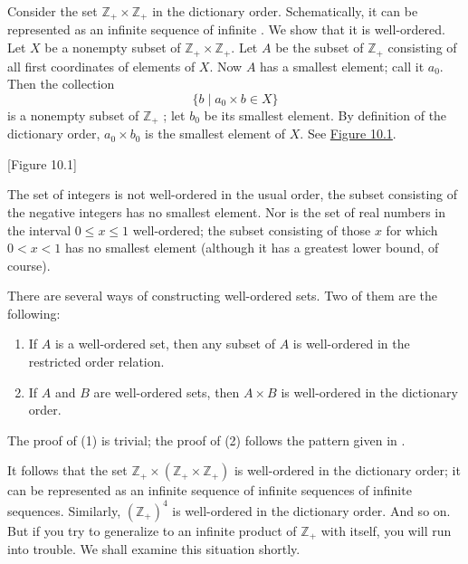\begin{centeredblock}
 \begin{example}
\label{ex:\thesection.\theexample}
 Consider the set \(\mathbb{Z}_{+} \times {\mathbb{Z}}_{+}\) in the dictionary order. Schematically, it can be represented as an infinite sequence of infinite . We show that it is well-ordered. Let \(X\) be a nonempty subset of \(\mathbb{Z}_{+} \times {\mathbb{Z}}_{+}\). Let \(A\) be the subset of \(\mathbb{Z}_{+}\) consisting of all first coordinates of elements of \(X\). Now \(A\) has a smallest element; call it \(a_{0}\). Then the collection
 \[
 \{ {b \mid {a}_{0} \times b \in X}\}
 \]
 is a nonempty subset of \(\mathbb{Z}_{+}\) ; let \(b_{0}\) be its smallest element. By definition of the dictionary order, \(a_{0} \times {b}_{0}\) is the smallest element of \(X\). See \hyperref[fig:10.1]{Figure 10.1}.
 \end{example}
\end{centeredblock}

[Figure 10.1]
\begin{centeredblock}
 \begin{example}
\label{ex:\thesection.\theexample}
 The set of integers is not well-ordered in the usual order, the subset consisting of the negative integers has no smallest element. Nor is the set of real numbers in the interval \(0 \leq x \leq 1\) well-ordered; the subset consisting of those \(x\) for which \(0 < x < 1\) has no smallest element (although it has a greatest lower bound, of course).
 \end{example}
\end{centeredblock}

There are several ways of constructing well-ordered sets. Two of them are the following:
\begin{enumerate}[label=(\arabic*)]
 \item If \(A\) is a well-ordered set, then any subset of \(A\) is well-ordered in the restricted order relation.
 \item If \(A\) and \(B\) are well-ordered sets, then \(A \times B\) is well-ordered in the dictionary order.
\end{enumerate}
The proof of (1) is trivial; the proof of (2) follows the pattern given in .

It follows that the set \(\mathbb{Z}_{+} \times ({\mathbb{Z}_{+} \times {\mathbb{Z}}_{+}})\) 
is well-ordered in the dictionary order; it can be represented as an infinite sequence of 
infinite sequences of infinite sequences. Similarly, \({(\mathbb{Z}_{+}) }^{4}\) is well-ordered 
in the dictionary order. And so on. But if you try to generalize to an infinite product of 
\(\mathbb{Z}_{+}\) with itself, you will run into trouble. We shall examine this situation shortly.

